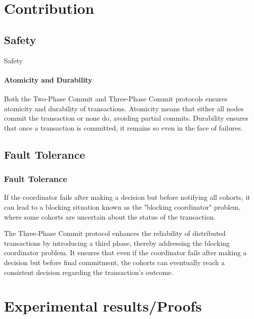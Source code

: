 \documentclass[11pt]{beamer}              %
\begin{document}
\section{Contribution}

\subsection{Safety}
\begin{frame}{Safety}
\framesubtitle{Atomicity and Durability}
Both the Two-Phase Commit and Three-Phase Commit protocols ensures atomicity and durability of transactions. Atomicity means that either all nodes commit the transaction or none do, avoiding partial commits. Durability ensures that once a transaction is committed, it remains so even in the face of failures.

\end{frame}


\subsection{Fault Tolerance}

\begin{frame}
\frametitle{Fault Tolerance}
If the coordinator fails after making a decision but before notifying all cohorts, it can lead to a blocking situation known as the "blocking coordinator" problem, where some cohorts are uncertain about the status of the transaction. 

The Three-Phase Commit protocol enhances the reliability of distributed transactions by introducing a third phase, thereby addressing the blocking coordinator problem. It ensures that even if the coordinator fails after making a decision but before final commitment, the cohorts can eventually reach a consistent decision regarding the transaction's outcome.

\end{frame}




\section{Experimental results/Proofs}
\end{document}
